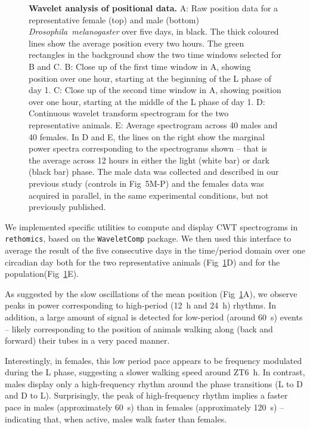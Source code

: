 \documentclass[10pt,letterpaper]{article}\usepackage[]{graphicx}\usepackage[]{color}
\begin{document}
\begin{figure}[!h]
	\caption{{\bf Wavelet analysis of positional data.}
		A: Raw position data for a representative female (top) and male (bottom) \emph{Drosophila~melanogaster} over five days, in black. 
		The thick coloured lines show the average position every two hours.
		The green rectangles in the background show the two time windows selected for B and C.
		B: Close up of the first time window in A, showing position over one hour, starting at the beginning of the L phase of day 1.
		C: Close up of the second time window in A, showing position over one hour, starting at the middle of the L phase of day 1.
		D: Continuous wavelet transform spectrogram for the two representative animals.
		E: Average spectrogram across 40 males and 40 females.
		In D and E, the lines on the right show the marginal power spectra corresponding to the spectrograms shown -- that is the average across 12 hours in either the light (white bar) or dark (black bar) phase.
		The male data was collected and described in our previous study \cite{geissmann_ethoscopes_2017} (controls in Fig~5M-P) and the females data was acquired in parallel, in the same experimental conditions, but not previously published.
	}
	\label{fig:fig-6}
\end{figure}



We implemented specific utilities to compute and display CWT spectrograms in \texttt{rethomics}, based on the \texttt{WaveletComp} package\cite{schmidbauer_waveletcomp_2018}. 
We then used this interface to average the result of the five consecutive days in the time/period domain over one circadian day both for the two representative animals (Fig~\ref{fig:fig-6}D)
and for the population(Fig~\ref{fig:fig-6}E).

As suggested by the slow oscillations of the mean position (Fig~\ref{fig:fig-6}A), we observe peaks in power corresponding to high-period (12~h and 24~h) rhythms.
In addition, a large amount of signal is detected for low-period (around 60~s) events -- 
likely corresponding to the position of animals walking along (back and forward) their tubes in a very paced manner.

Interestingly, in females, this low period pace appears to be frequency modulated during the L phase, suggesting a slower walking speed around ZT6~h.
In contrast, males display only a high-frequency rhythm around the phase transitions (L to D and D to L).
Surprisingly, the peak of high-frequency rhythm implies a faster pace in males (approximately 60~s) than in females (approximately 120~s) --
indicating that, when active, males walk faster than females. 
\end{document}

